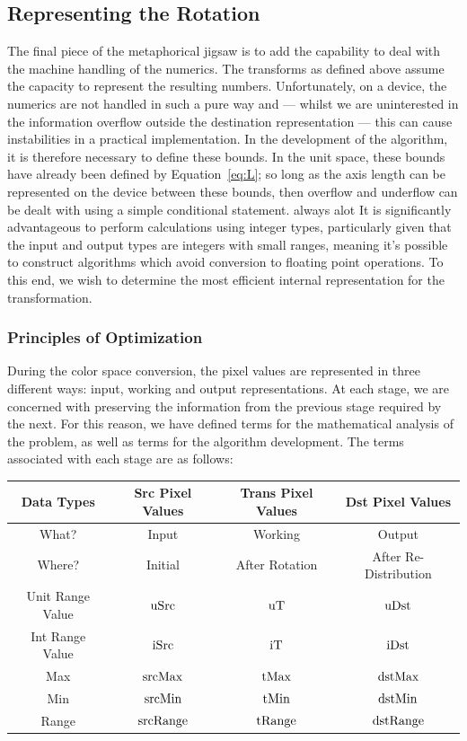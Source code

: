 \subsection{Representing the Rotation}

The final piece of the metaphorical jigsaw is to add the capability to deal with the machine handling of the numerics. The transforms as defined above assume the capacity to represent the resulting numbers. Unfortunately, on a device, the numerics are not handled in such a pure way and --- whilst we are uninterested in the information overflow outside the destination representation --- this can cause instabilities in a practical implementation. In the development of the algorithm, it is therefore necessary to define these bounds. In the unit space, these bounds have already been defined by Equation~\ref{eq:L}; so long as the axis length can be represented on the device between these bounds, then overflow and underflow can be dealt with using a simple conditional statement.
always  alot 
It is significantly advantageous to perform calculations using integer types, particularly given that the input and output types are integers with small ranges, meaning it's possible to construct algorithms which avoid conversion to floating point operations. To this end, we wish to determine the most efficient internal representation for the transformation.

\subsubsection{Principles of Optimization}

During the color space conversion, the pixel values are represented in three different ways: input, working and output representations. At each stage, we are concerned with preserving the information from the previous stage required by the next. For this reason, we have defined terms for the mathematical analysis of the problem, as well as terms for the algorithm development. The terms associated with each stage are as follows:

\begin{tabular}{|c|c|c|c|}
  \hline
     Data Types & Src Pixel Values & Trans Pixel Values & Dst Pixel Values \\ \hline
  What? & Input & Working & Output \\ \hline
  Where? & Initial & After Rotation & After Re-Distribution \\ \hline
  Unit Range Value & $ \text{uSrc} $ & $\text{uT}$ & $\text{uDst}$ \\ \cline{1-1}
  Int Range Value & $\text{iSrc}$ & $\text{iT}$ & $\text{iDst}$ \\ \cline{1-1}
  Max & $\text{srcMax}$ & $\text{tMax}$ & $\text{dstMax}$ \\ \cline{1-1}
  Min & $\text{srcMin}$ & $\text{tMin}$ & $\text{dstMin}$ \\ \cline{1-1}
  Range & $\text{srcRange}$ & $\text{tRange}$ & $\text{dstRange}$ \\
  \hline
\end{tabular}


